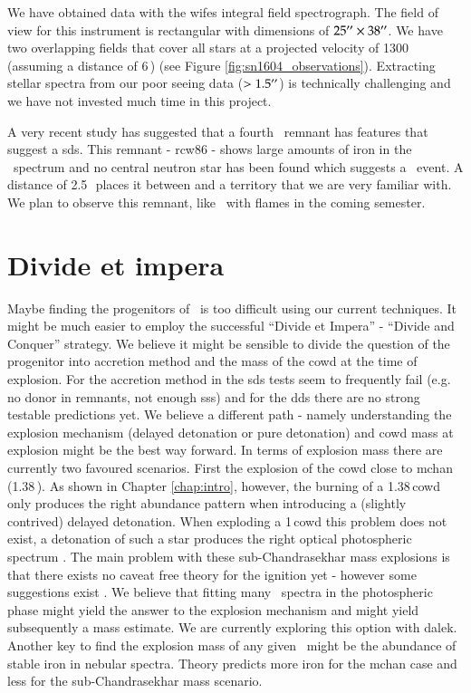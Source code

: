 We have obtained data with the \gls{wifes} integral field spectrograph. The field of view for this instrument is rectangular with dimensions of $25\hbox{$^{\prime\prime}$} \times 38\hbox{$^{\prime\prime}$}$. We have two overlapping fields that cover all stars at a projected velocity of 1300\,\kms (assuming a distance of 6\,\kpc) (see Figure \ref{fig:sn1604_observations}). Extracting stellar spectra from our poor seeing data ($> 1.5\hbox{$^{\prime\prime}$}$) is technically challenging and we have not invested much time in this project.

A very recent study \citep{2011arXiv1108.1207W} has suggested that a fourth \snia\ remnant has features that suggest a \gls{sds}. This remnant - \gls{rcw86} - shows large amounts of iron in the \xray\ spectrum and no central neutron star has been found which suggests a \snia\ event. A distance of 2.5\,\kpc\ places it between  and  a territory that we are very familiar with. We plan to observe this remnant, like \ with \gls{flames} in the coming semester.



\section{Divide et impera}

Maybe finding the progenitors of \sneia\ is too difficult using our current techniques. It might be much easier to employ the successful ``Divide et Impera'' - ``Divide and Conquer'' strategy. We believe it might be sensible to divide the question of the progenitor into accretion method and the mass of the \gls{cowd} at the time of explosion. For the accretion method in the \gls{sds} tests seem to frequently fail (e.g. no donor in remnants, not enough \gls{sss}) and for the \gls{dds} there are no strong testable predictions yet. We believe a different path - namely understanding the explosion mechanism (delayed detonation or pure detonation) and \gls{cowd} mass at explosion might be the best way forward.  In terms of explosion mass there are currently two favoured scenarios. First the explosion of the \gls{cowd} close to \gls{mchan} (1.38\,\msun). As shown in Chapter \vref{chap:intro}, however, the burning of a 1.38\,\msun \gls{cowd} only produces the right abundance pattern when introducing a (slightly contrived) delayed detonation. When exploding a 1\,\msun \gls{cowd} this problem does not exist, a detonation of such a star produces the right optical photospheric spectrum \citep{2010ApJ...714L..52S}. The main problem with these sub-Chandrasekhar mass explosions is that there exists no caveat free theory for the ignition yet - however some suggestions exist \citep[e.g.][]{2010ApJ...714L..52S}. 
We believe that fitting many \snia\ spectra in the photospheric phase might yield the answer to the explosion mechanism and might yield subsequently a mass estimate. We are currently exploring this option with \gls{dalek}.
Another key to find the explosion mass of any given \snia\ might be the abundance of stable iron in nebular spectra. Theory predicts more iron for the \gls{mchan} case and less for the  sub-Chandrasekhar mass scenario.

